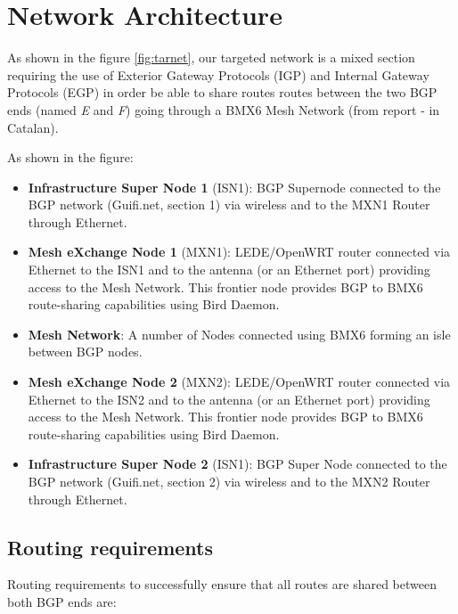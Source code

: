 \chapter{Network Architecture}
\label{ch:architecture}
\pagestyle{headings}

As shown in the figure \ref{fig:tarnet}, our targeted network is a mixed section requiring the use of Exterior Gateway Protocols (IGP) and Internal Gateway Protocols (EGP) in order be able to share routes routes between the two BGP ends (named \textit{E} and \textit{F}) going through a BMX6 Mesh Network (from report \cite{bgpbmx6} - in Catalan). 

As shown in the figure:
\begin{itemize}
    \item \textbf{Infrastructure Super Node 1} (ISN1): BGP Supernode connected to the BGP network (Guifi.net, section 1) via wireless and to the MXN1 Router through Ethernet.     
    \item \textbf{Mesh eXchange Node 1} (MXN1): LEDE/OpenWRT router connected via Ethernet to the ISN1 and to the antenna (or an Ethernet port) providing access to the Mesh Network. This frontier node provides BGP to BMX6 route-sharing capabilities using Bird Daemon.
    \item \textbf{Mesh Network}: A number of Nodes connected using BMX6 forming an isle between BGP nodes.
    \item \textbf{Mesh eXchange Node 2} (MXN2): LEDE/OpenWRT router connected via Ethernet to the ISN2 and to the antenna (or an Ethernet port) providing access to the Mesh Network. This frontier node provides BGP to BMX6 route-sharing capabilities using Bird Daemon.
    \item \textbf{Infrastructure Super Node 2} (ISN1): BGP Super Node connected to the BGP network (Guifi.net, section 2) via wireless and to the MXN2 Router through Ethernet.
\end{itemize}


\section{Routing requirements}
Routing requirements to successfully ensure that all routes are shared between both BGP ends are:

